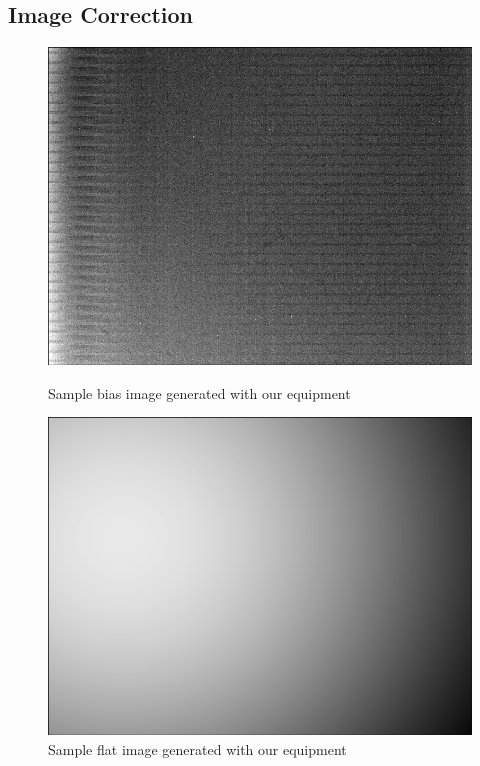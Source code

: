\subsection{Image Correction}

\begin{figure}[ht]
    \centering
    \begin{minipage}[b]{\figwidth}
        \centering
        \includegraphics[width=\textwidth]{images/bias.png}
        \caption{Sample bias image generated with our equipment}
        \label{fig:bias_image}
    \end{minipage}\quad\quad
    \begin{minipage}[b]{\figwidth}
        \includegraphics[width=\textwidth]{images/flat.png}
        \caption{Sample flat image generated with our equipment}
        \label{fig:flat_image}
    \end{minipage}
\end{figure}

